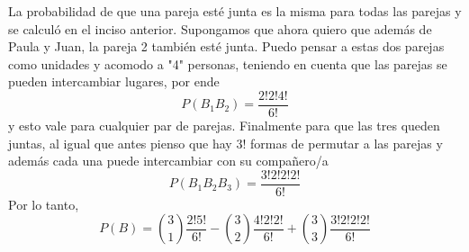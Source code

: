 \begin{enumerate}
            La probabilidad de que una pareja esté junta es la misma para todas las parejas y se calculó en el inciso anterior. Supongamos que ahora quiero que además de Paula y Juan, la pareja 2 también esté junta. Puedo pensar a estas dos parejas como unidades y acomodo a "4" personas, teniendo en cuenta que las parejas se pueden intercambiar lugares, por ende \[P(B_1B_2)=\frac{2!2!4!}{6!}\]
            y esto vale para cualquier par de parejas. Finalmente para que las tres queden juntas, al igual que antes pienso que hay 3! formas de permutar a las parejas y además cada una puede intercambiar con su compañero/a\[P(B_1B_2B_3)=\frac{3!2!2!2!}{6!}\]
            Por lo tanto,\[P(B)=\binom{3}{1}\frac{2!5!}{6!}-\binom{3}{2}\frac{4!2!2!}{6!}+\binom{3}{3}\frac{3!2!2!2!}{6!}\]
    \end{enumerate}